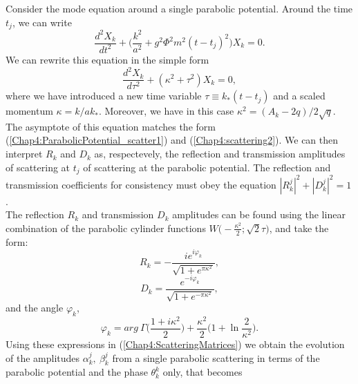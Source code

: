 \documentclass[11pt,a4paper,twoside]{book}
\begin{document}
Consider the mode equation around a single parabolic potential. Around the time $ t_{j} $, we can write
\begin{equation}
	\label{Chap4:EquationXkAroundtj}
	\frac{d^{2}X_{k}}{dt^{2}} + \Bigg(\frac{k^{2}}{a^{2}} + g^{2}\Phi^{2}m^{2}(t-t_{j})^{2}\Bigg)X_{k}=0.
\end{equation}
We can rewrite this equation in the simple form 
\begin{equation}
	\label{Chap4:EquationXkAround2}
	\frac{d^{2}X_{k}}{d\tau^{2}} + (\kappa^{2} + \tau^{2})X_{k}=0,
\end{equation}
where we have introduced a new time variable $ \tau \equiv k_{*}(t-t_{j}) $ and a scaled momentum $ \kappa = k/ak_{*} $. Moreover, we have in this case $ \kappa^{2} = (A_{k}-2q)/2\sqrt{q} $. The asymptote of this equation matches the form (\ref{Chap4:ParabolicPotential_scatter1}) and (\ref{Chap4:scattering2}). We can then interpret $ R_{k} $ and $ D_{k} $ as, respectevely, the reflection and transmission amplitudes of scattering at $ t_{j} $ of scattering at the parabolic potential. The reflection and transmission coefficients for consistency must obey the equation $ |R_{k}^{j}|^{2}  +  |D_{k}^{j}|^{2} = 1$.\\
The reflection $ R_{k} $ and transmission  $ D_{k} $ amplitudes can be found using  the linear combination of the parabolic cylinder functions $ W\Bigg(-\frac{\kappa^{2}}{2};\sqrt{2}\tau\Bigg) $, and take the form:
\begin{equation}
R_{k}=-\frac{ie^{i\varphi_{k}}}{\sqrt{1+e^{\pi \kappa^{2}}}},
\end{equation}
\begin{equation}
	D_{k} = \frac{e^{-i\varphi_{k}}}{\sqrt{1+e^{-\pi \kappa^{2}}}},
\end{equation}
and the angle $ \varphi_{k} $,
\begin{equation}
\label{Chap4:angleParabolicPotential}
\varphi_{k}=arg\ \Gamma\Bigg(\frac{1+i\kappa^{2}}{2}\Bigg) + \frac{\kappa^{2}}{2}\Bigg(1+\ln \frac{2}{\kappa^{2}}\Bigg).
\end{equation}
Using these expressions in (\ref{Chap4:ScatteringMatrices}) we obtain the evolution of the amplitudes $ \alpha^{j}_{k},\ \beta_{k}^{j} $ from a single parabolic scattering in terms of the parabolic potential and the phase $ \theta_{k}^{k} $ only, that becomes
\end{document}

